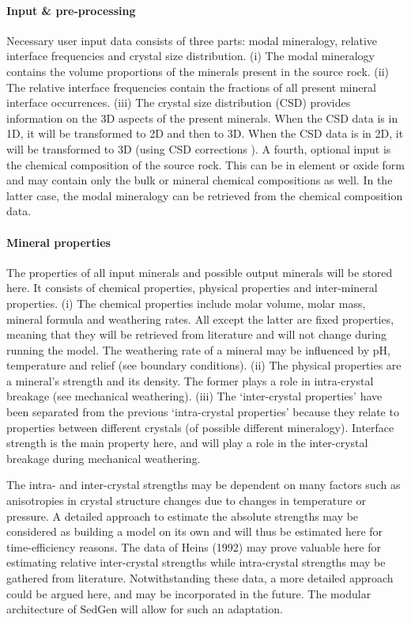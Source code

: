 \paragraph{Input \& pre-processing}
Necessary user input data consists of three parts: modal mineralogy, relative interface frequencies and crystal size distribution. %
(i) The modal mineralogy contains the volume proportions of the minerals present in the source rock. %
(ii) The relative interface frequencies contain the fractions of all present mineral interface occurrences. %
(iii) The crystal size distribution (CSD) provides information on the 3D aspects of the present minerals. %
When the CSD data is in 1D, it will be transformed to 2D and then to 3D. %
When the CSD data is in 2D, it will be transformed to 3D (using CSD corrections \cite{Higgins2010}). %
A fourth, optional input is the chemical composition of the source rock. %
This can be in element or oxide form and may contain only the bulk or mineral chemical compositions as well. %
In the latter case, the modal mineralogy can be retrieved from the chemical composition data. %

\paragraph{Mineral properties}
The properties of all input minerals and possible output minerals will be stored here. %
It consists of chemical properties, physical properties and inter-mineral properties. %
(i) The chemical properties include molar volume, molar mass, mineral formula and weathering rates. %
All except the latter are fixed properties, meaning that they will be retrieved from literature and will not change during running the model. %
The weathering rate of a mineral may be influenced by pH, temperature and relief (see boundary conditions). %
(ii) The physical properties are a mineral’s strength and its density. %
The former plays a role in intra-crystal breakage (see mechanical weathering). %
(iii) The ‘inter-crystal properties’ have been separated from the previous ‘intra-crystal properties’ because they relate to properties between different crystals (of possible different mineralogy). %
Interface strength is the main property here, and will play a role in the inter-crystal breakage during mechanical weathering. %
\linebreak

The intra- and inter-crystal strengths may be dependent on many factors such as anisotropies in crystal structure changes due to changes in temperature or pressure. %
A detailed approach to estimate the absolute strengths may be considered as building a model on its own and will thus be estimated here for time-efficiency reasons. %
The data of Heins (1992) may prove valuable here for estimating relative inter-crystal strengths while intra-crystal strengths may be gathered from literature. %
Notwithstanding these data, a more detailed approach could be argued here, and may be incorporated in the future. %
The modular architecture of SedGen will allow for such an adaptation. %

